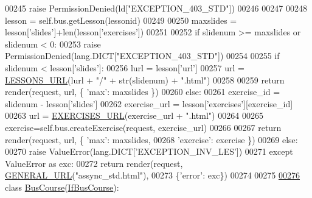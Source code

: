 \begin{DoxyCode}
00245                             \textcolor{keywordflow}{raise} PermissionDenied(ld[\textcolor{stringliteral}{"EXCEPTION\_403\_STD"}])
00246                         
00247 
00248                     lesson = self.bus.getLesson(lessonid)
00249 
00250                     maxslides = lesson[\textcolor{stringliteral}{'slides'}]+len(lesson[\textcolor{stringliteral}{'exercises'}])
00251 
00252                     \textcolor{keywordflow}{if} slidenum >= maxslides \textcolor{keywordflow}{or} slidenum < 0:
00253                         \textcolor{keywordflow}{raise} PermissionDenied(lang.DICT[\textcolor{stringliteral}{"EXCEPTION\_403\_STD"}])
00254 
00255                     \textcolor{keywordflow}{if} slidenum < lesson[\textcolor{stringliteral}{'slides'}]:
00256                         lurl = lesson[\textcolor{stringliteral}{'url'}]
00257                         url = \hyperlink{namespaceCourse_1_1macros_a4473a418de016b59cce33b13440e469b}{LESSONS\_URL}(lurl + \textcolor{stringliteral}{"/"} + str(slidenum) + \textcolor{stringliteral}{".html"})
00258 
00259                         \textcolor{keywordflow}{return} render(request, url, \{ \textcolor{stringliteral}{'max'}: maxslides \})
00260                     \textcolor{keywordflow}{else}:
00261                         exercise\_id = slidenum - lesson[\textcolor{stringliteral}{'slides'}]
00262                         exercise\_url = lesson[\textcolor{stringliteral}{'exercises'}][exercise\_id]
00263                         url = \hyperlink{namespaceCourse_1_1macros_ac1cf8b3a78128ab6a3bac4f6be9fabbd}{EXERCISES\_URL}(exercise\_url + \textcolor{stringliteral}{".html"})
00264 
00265                         exercise=self.bus.createExercise(request, exercise\_url)
00266 
00267                         \textcolor{keywordflow}{return} render(request, url, \{ \textcolor{stringliteral}{'max'}: maxslides,
00268                                                       \textcolor{stringliteral}{'exercise'}: exercise \})
00269                 \textcolor{keywordflow}{else}:
00270                     \textcolor{keywordflow}{raise} ValueError(lang.DICT[\textcolor{stringliteral}{'EXCEPTION\_INV\_LES'}])
00271             \textcolor{keywordflow}{except} ValueError \textcolor{keyword}{as} exc:
00272                 \textcolor{keywordflow}{return} render(request, \hyperlink{namespaceCourse_1_1macros_a9a69c2455c0c121b1c01960629575d7e}{GENERAL\_URL}(\textcolor{stringliteral}{"assync\_std.html"}),
00273                         \{\textcolor{stringliteral}{'error'}: exc\})
00274                 
00275 
\hypertarget{CourseUnit_8py_source_l00276}{}\hyperlink{classCourse_1_1CourseUnit_1_1BusCourse}{00276} \textcolor{keyword}{class }\hyperlink{classCourse_1_1CourseUnit_1_1BusCourse}{BusCourse}(\hyperlink{classCourse_1_1CourseUnit_1_1IfBusCourse}{IfBusCourse}):

\end{DoxyCode}

